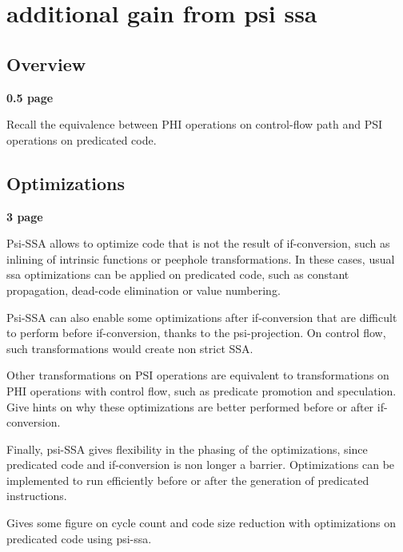 \chapter{additional gain from psi ssa }




\section{Overview}

\textbf{0.5 page}

Recall the equivalence between PHI operations on control-flow path and PSI operations on predicated code.


\section{Optimizations}

\textbf{3 page}

Psi-SSA allows to optimize code that is not the result of if-conversion, such as inlining of intrinsic functions or peephole transformations. In these cases, usual ssa optimizations can be applied on predicated code, such as constant propagation, dead-code elimination or value numbering.

Psi-SSA can also enable some optimizations after if-conversion that are difficult to perform before if-conversion, thanks to the psi-projection. On control flow, such transformations would create non strict SSA.

Other transformations on PSI operations are equivalent to transformations on PHI operations with control flow, such as predicate promotion and speculation. Give hints on why these optimizations are better performed before or after if-conversion.

Finally, psi-SSA gives flexibility in the phasing of the optimizations, since predicated code and if-conversion is non longer a barrier. Optimizations can be implemented to run efficiently before or after the generation of predicated instructions.

Gives some figure on cycle count and code size reduction with optimizations on predicated code using psi-ssa.
